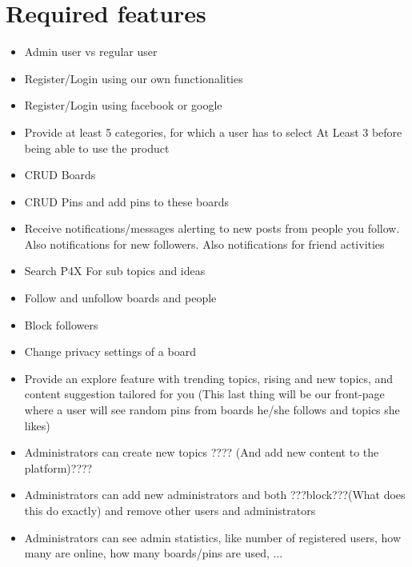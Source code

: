 \documentclass{article}
\begin{document}
\section{Required features}
\begin{itemize}
\item Admin user vs regular user
\item Register/Login using our own functionalities
\item Register/Login using facebook or google
\item Provide at least 5 categories, for which a user has to select At Least 3 before being able to use the product
\item CRUD Boards
\item CRUD Pins and add pins to these boards
\item Receive notifications/messages alerting to new posts from people you follow. Also notifications for new followers. Also notifications for friend activities
\item Search P4X For sub topics and ideas
\item Follow and unfollow boards and people
\item Block followers
\item Change privacy settings of a board
\item Provide an explore feature with trending topics, rising and new topics, and content suggestion tailored for you (This last thing will be our front-page where a user will see random pins from boards he/she follows and topics she likes)
\item Administrators can create new topics   ???? (And add new content to the platform)????
\item Administrators can add new administrators and both ???block???(What does this do exactly) and remove other users and administrators
\item Administrators can see admin statistics, like number of registered users, how many are online, how many boards/pins are used, ...
\end{itemize}
\end{document}
